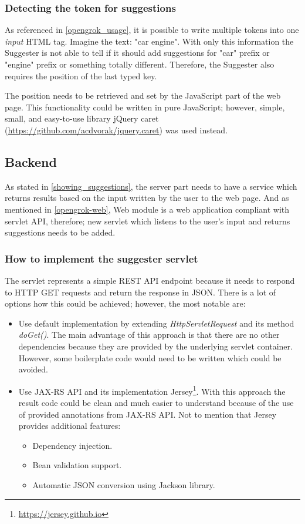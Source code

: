 \subsubsection{Detecting the token for suggestions}
As referenced in \ref{opengrok_usage}, it is possible to write multiple tokens into one \textit{input} HTML tag.
Imagine the text: "car engine". With only this information the Suggester is not able to tell if it should add
suggestions for "car" prefix or "engine" prefix or something totally different. Therefore, the Suggester also requires the position of the last typed
key.

The position needs to be retrieved and set by the JavaScript part of the web page. This functionality could be written in
pure JavaScript; however, simple, small, and easy-to-use library jQuery caret (\url{https://github.com/acdvorak/jquery.caret})
was used instead.

\subsection{Backend}
As stated in \ref{showing_suggestions}, the server part needs to have a service which returns results based on the
input written by the user to the web page. And as mentioned in \ref{opengrok-web}, Web module is a web application compliant with
servlet API, therefore; new servlet which listens to the user's input and returns suggestions needs to be added.

\subsubsection{How to implement the suggester servlet}
The servlet represents a simple REST API endpoint
because it needs to respond to HTTP GET requests and return the response in JSON.
There is a lot of options how this could be achieved; however, the most notable are:
\begin{itemize}
    \item Use default implementation by extending \textit{HttpServletRequest} and its method \textit{doGet()}. The main
    advantage of this approach is that there are no other dependencies because they are provided by the underlying servlet container.
     However, some boilerplate code would need
    to be written which could be avoided.
    \item Use JAX-RS API and its implementation Jersey\footnote{\url{https://jersey.github.io}}. With this approach the
    result code could be clean and much easier to understand because of the use of provided annotations from JAX-RS API.
    Not to mention that Jersey provides additional features:
    \begin{itemize}
        \item Dependency injection.
        \item Bean validation support.
        \item Automatic JSON conversion using Jackson library.
    \end{itemize}
\end{itemize}

